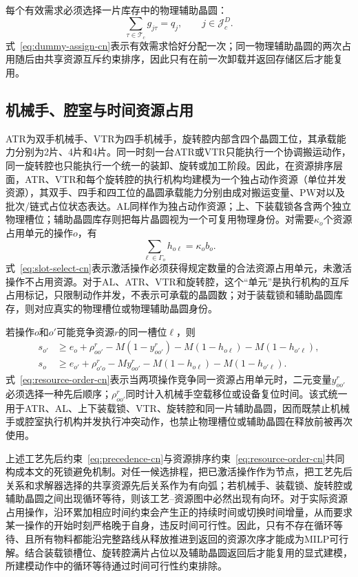 \documentclass[journal]{IEEEtran}
\begin{document}
每个有效需求必须选择一片库存中的物理辅助晶圆：
\begin{equation}
\sum_{\tau\in\mathcal T_c}g_{j\tau}=q_j,
\qquad j\in\mathcal J_c^D.
\label{eq:dummy-assign-cn}
\end{equation}
式~\eqref{eq:dummy-assign-cn}表示有效需求恰好分配一次；同一物理辅助晶圆的两次占用随后由共享资源互斥约束排序，因此只有在前一次卸载并返回存储区后才能复用。

\subsection{机械手、腔室与时间资源占用}

ATR为双手机械手、VTR为四手机械手，旋转腔内部含四个晶圆工位，其承载能力分别为2片、4片和4片。同一时刻一台ATR或VTR只能执行一个协调搬运动作，同一旋转腔也只能执行一个统一的装卸、旋转或加工阶段。因此，在资源排序层面，ATR、VTR和每个旋转腔的执行机构均建模为一个独占动作资源（单位并发资源），其双手、四手和四工位的晶圆承载能力分别由成对搬运变量、PW对以及批次/链式占位状态表达。AL同样作为独占动作资源；上、下装载锁各含两个独立物理槽位；辅助晶圆库存则把每片晶圆视为一个可复用物理身份。对需要$\kappa_o$个资源占用单元的操作$o$，有
\begin{equation}
\sum_{\ell\in\Gamma_o}h_{o\ell}=\kappa_ob_o.
\label{eq:slot-select-cn}
\end{equation}
式~\eqref{eq:slot-select-cn}表示激活操作必须获得规定数量的合法资源占用单元，未激活操作不占用资源。对于AL、ATR、VTR和旋转腔，这个“单元”是执行机构的互斥占用标记，只限制动作并发，不表示可承载的晶圆数；对于装载锁和辅助晶圆库存，则对应真实的物理槽位或物理辅助晶圆身份。

若操作$o$和$o'$可能竞争资源$r$的同一槽位$\ell$，则
\begin{equation}
\begin{aligned}
s_{o'}&\ge e_o+\rho^r_{oo'}-M(1-y^r_{oo'})
-M(1-h_{o\ell})-M(1-h_{o'\ell}),\\
s_o&\ge e_{o'}+\rho^r_{o'o}-My^r_{oo'}
-M(1-h_{o\ell})-M(1-h_{o'\ell}).
\end{aligned}
\label{eq:resource-order-cn}
\end{equation}
式~\eqref{eq:resource-order-cn}表示当两项操作竞争同一资源占用单元时，二元变量$y^r_{oo'}$必须选择一种先后顺序；$\rho^r_{oo'}$同时计入机械手空载移位或设备复位时间。该式统一用于ATR、AL、上下装载锁、VTR、旋转腔和同一片辅助晶圆，因而既禁止机械手或腔室执行机构并发执行冲突动作，也禁止物理槽位或辅助晶圆在释放前被再次使用。

上述工艺先后约束~\eqref{eq:precedence-cn}与资源排序约束~\eqref{eq:resource-order-cn}共同构成本文的死锁避免机制。对任一候选排程，把已激活操作作为节点，把工艺先后关系和求解器选择的共享资源先后关系作为有向弧；若机械手、装载锁、旋转腔或辅助晶圆之间出现循环等待，则该工艺--资源图中必然出现有向环。对于实际资源占用操作，沿环累加相应时间约束会产生正的持续时间或切换时间增量，从而要求某一操作的开始时刻严格晚于自身，违反时间可行性。因此，只有不存在循环等待、且所有物料都能沿完整路线从释放推进到返回的资源次序才能成为MILP可行解。结合装载锁槽位、旋转腔满片占位以及辅助晶圆返回后才能复用的显式建模，所建模动作中的循环等待通过时间可行性约束排除。
\end{document}
